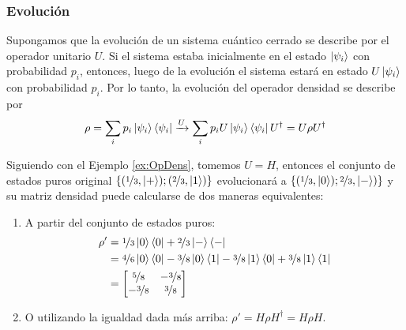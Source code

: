 \subsubsection{Evolución}
Supongamos que la evolución de un sistema cuántico cerrado se describe por el
operador unitario $U$. Si el sistema estaba inicialmente en el estado
$\ket{\psi_i}$ con probabilidad $p_i$, entonces, luego de la evolución el
sistema estará en estado $U\ket{\psi_i}$ con probabilidad $p_i$. Por lo tanto,
la evolución del operador densidad se describe por
\[
  \rho = \sum_i p_i\ket{\psi_i}\bra{\psi_i}\xrightarrow{U}\sum_ip_i
  U\ket{\psi_i}\bra{\psi_i}U^\dagger=U\rho U^\dagger
\]
\begin{ejemplo}
  Siguiendo con el Ejemplo \ref{ex:OpDens}, tomemos $U=H$, entonces el conjunto
  de estados puros original $\{(\nicefrac 13,\ket +);(\nicefrac 23,\ket 1)\}$
  evolucionará a $\{(\nicefrac 13,\ket 0);\nicefrac 23,\ket -)\}$ y su matriz
  densidad puede calcularse de dos maneras equivalentes:
  \begin{enumerate}
  \item A partir del conjunto de estados puros:
    \begin{align*}
      \rho'&=\nicefrac 13\ket 0\bra 0+\nicefrac 23\ket -\bra - \\
      &= \nicefrac 46\ket
      0\bra 0 -\nicefrac 38\ket 0\bra 1 -\nicefrac 38\ket 1\bra 0 +\nicefrac
      38\ket 1\bra 1 \\
      &=\begin{bmatrix}\nicefrac 58 & -\nicefrac 38 \\ -\nicefrac 38 &
        \nicefrac 38\end{bmatrix}
    \end{align*}
  \item O utilizando la igualdad dada más arriba: $\rho'= H\rho H^\dagger = H\rho H$.
  \end{enumerate}
\end{ejemplo}

